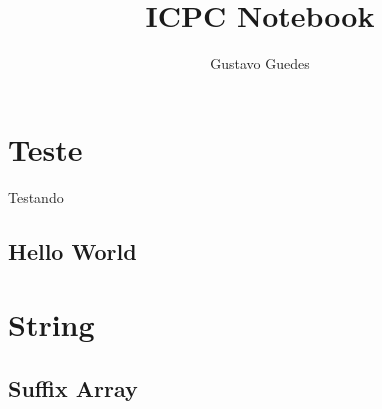 \documentclass[a4paper, 10pt,twoside]{article}
\title{ICPC Notebook}
\author{Gustavo Guedes}
\newcommand\includes[2]{
   \subsection{#1}
   
}
\begin{document}
	\maketitle
	\begin{multicols*}{2}
		\tableofcontents
		\thispagestyle{fancy}
		
		\section{Teste}
			Testando
			\includes{Hello World}{code/helloworld.cpp}
		\section{String}
			\includes{Suffix Array}{code/suffix_array.cpp}
			
		
	\end{multicols*}
\end{document}

